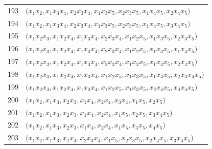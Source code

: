 {\begin{longtable}{@{}r>{\raggedright\arraybackslash}p{}@{}}
193 & \(\bigl(x_{1}x_{2},\allowbreak x_{1}x_{3}x_{4},\allowbreak x_{2}x_{3}x_{4},\allowbreak x_{1}x_{3}x_{5},\allowbreak x_{2}x_{3}x_{5},\allowbreak x_{1}x_{4}x_{5},\allowbreak x_{2}x_{4}x_{5}\bigr)\) \\
194 & \(\bigl(x_{1}x_{2},\allowbreak x_{1}x_{3}x_{4},\allowbreak x_{2}x_{3}x_{4},\allowbreak x_{1}x_{3}x_{5},\allowbreak x_{2}x_{3}x_{5},\allowbreak x_{1}x_{4}x_{5},\allowbreak x_{3}x_{4}x_{5}\bigr)\) \\
195 & \(\bigl(x_{1}x_{2}x_{3},\allowbreak x_{1}x_{2}x_{4},\allowbreak x_{1}x_{3}x_{4},\allowbreak x_{2}x_{3}x_{4},\allowbreak x_{1}x_{2}x_{5},\allowbreak x_{1}x_{3}x_{5},\allowbreak x_{2}x_{3}x_{5}\bigr)\) \\
196 & \(\bigl(x_{1}x_{2}x_{3},\allowbreak x_{1}x_{2}x_{4},\allowbreak x_{1}x_{3}x_{4},\allowbreak x_{2}x_{3}x_{4},\allowbreak x_{1}x_{2}x_{5},\allowbreak x_{1}x_{3}x_{5},\allowbreak x_{1}x_{4}x_{5}\bigr)\) \\
197 & \(\bigl(x_{1}x_{2}x_{3},\allowbreak x_{1}x_{2}x_{4},\allowbreak x_{1}x_{3}x_{4},\allowbreak x_{2}x_{3}x_{4},\allowbreak x_{1}x_{2}x_{5},\allowbreak x_{1}x_{3}x_{5},\allowbreak x_{2}x_{4}x_{5}\bigr)\) \\
198 & \(\bigl(x_{1}x_{2}x_{3},\allowbreak x_{1}x_{2}x_{4},\allowbreak x_{1}x_{3}x_{4},\allowbreak x_{1}x_{2}x_{5},\allowbreak x_{1}x_{3}x_{5},\allowbreak x_{1}x_{4}x_{5},\allowbreak x_{2}x_{3}x_{4}x_{5}\bigr)\) \\
199 & \(\bigl(x_{1}x_{2}x_{3},\allowbreak x_{1}x_{2}x_{4},\allowbreak x_{1}x_{3}x_{4},\allowbreak x_{1}x_{2}x_{5},\allowbreak x_{1}x_{3}x_{5},\allowbreak x_{2}x_{4}x_{5},\allowbreak x_{3}x_{4}x_{5}\bigr)\) \\
200 & \(\bigl(x_{1}x_{2},\allowbreak x_{1}x_{3},\allowbreak x_{2}x_{3},\allowbreak x_{1}x_{4},\allowbreak x_{2}x_{4},\allowbreak x_{3}x_{4},\allowbreak x_{1}x_{5},\allowbreak x_{2}x_{5}\bigr)\) \\
201 & \(\bigl(x_{1}x_{2},\allowbreak x_{1}x_{3},\allowbreak x_{2}x_{3},\allowbreak x_{1}x_{4},\allowbreak x_{2}x_{4},\allowbreak x_{1}x_{5},\allowbreak x_{2}x_{5},\allowbreak x_{3}x_{4}x_{5}\bigr)\) \\
202 & \(\bigl(x_{1}x_{2},\allowbreak x_{1}x_{3},\allowbreak x_{2}x_{3},\allowbreak x_{1}x_{4},\allowbreak x_{2}x_{4},\allowbreak x_{1}x_{5},\allowbreak x_{3}x_{5},\allowbreak x_{4}x_{5}\bigr)\) \\
203 & \(\bigl(x_{1}x_{2},\allowbreak x_{1}x_{3},\allowbreak x_{1}x_{4},\allowbreak x_{2}x_{3}x_{4},\allowbreak x_{1}x_{5},\allowbreak x_{2}x_{3}x_{5},\allowbreak x_{2}x_{4}x_{5},\allowbreak x_{3}x_{4}x_{5}\bigr)\) \\

\end{longtable}}
